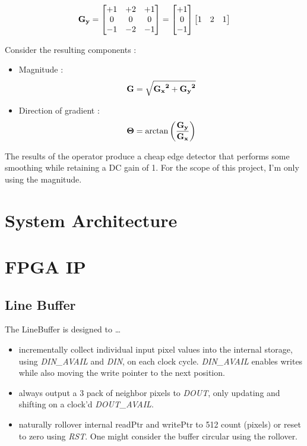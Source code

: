 \documentclass[a4paper]{report}
\begin{document}
			\[ 
				\bf{G_y} =
				\begin{bmatrix}
					+1 & +2 & +1 \\
					0 & 0 & 0 \\
					-1 & -2 & -1
				\end{bmatrix}
				= 
				\begin{bmatrix} +1 \\ 0 \\ -1 \end{bmatrix}
				\begin{bmatrix} 1 & 2 & 1 \end{bmatrix}
			\]
 
			Consider the resulting components : 
			\begin{itemize}
				\item Magnitude : $$\bf{G} = \sqrt{\bf{G_x}^2 + \bf{G_y} ^ 2}$$
				\item Direction of gradient : $$\bf{\Theta} = \arctan{\left(\frac{G_y}{G_x}\right)}$$
			\end{itemize}

			The results of the operator produce a cheap edge detector that 
			performs some smoothing while retaining a DC gain of 1.
			For the scope of this project, I'm only using the magnitude.

	\chapter{System Architecture}

	\chapter{FPGA IP}
	
		\section{Line Buffer}

			The LineBuffer is designed to \ldots
			\begin{itemize}
				\item incrementally collect individual input pixel values 
						into the internal storage, using \textit{DIN\_AVAIL} 
						and \textit{DIN}, on each clock cycle. \textit{DIN\_AVAIL}
						enables writes while also moving the write pointer to the 
						next position.
				\item always output a 3 pack of neighbor pixels to \textit{DOUT},
						only updating and shifting on a clock'd \textit{DOUT\_AVAIL}.

				\item naturally rollover internal readPtr and writePtr to
						512 count (pixels) or reset to zero using \textit{RST}.
						One might consider the buffer circular using the rollover.
			\end{itemize}
\end{document}
